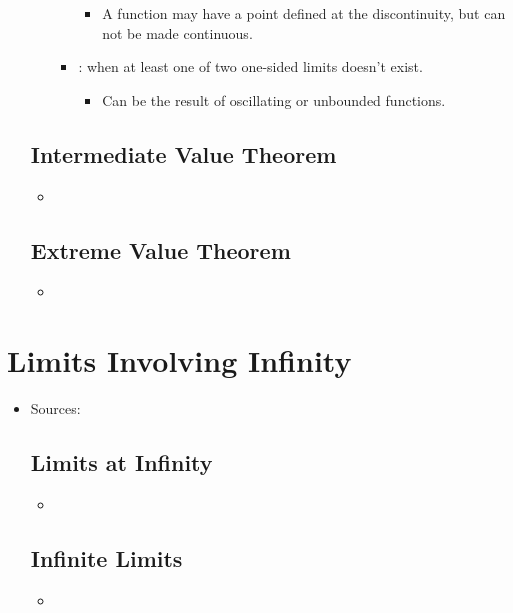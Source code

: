 \begin{itemize}
\begin{itemize}
\begin{itemize}
        \begin{itemize}
          \item A function may have a point defined at the discontinuity, but can not be made continuous.
        \end{itemize}
        \item {}: when at least one of two one-sided limits doesn't exist.
          \begin{itemize}
            \item Can be the result of oscillating or unbounded functions.
          \end{itemize}
      \end{itemize}
  \end{itemize}
  
  \subsection{Intermediate Value Theorem}
  \begin{itemize}
    \item 
  \end{itemize}

  \subsection{Extreme Value Theorem}
  \begin{itemize}
    \item 
  \end{itemize}
  
\end{itemize}

\section{Limits Involving Infinity}
\begin{itemize}
  \item Sources:

  \subsection{Limits at Infinity}
  \begin{itemize}
    \item 
  \end{itemize}

  \subsection{Infinite Limits}
  \begin{itemize}
    \item 
  \end{itemize}
  
  
\end{itemize}






